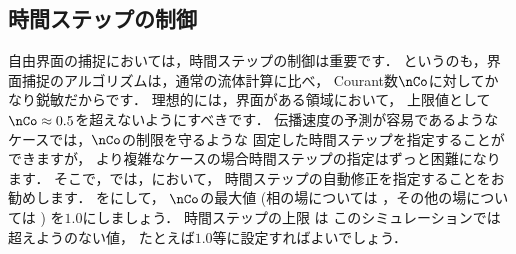 \subsection{時間ステップの制御}
\label{ssec:2.3.5}
自由界面の捕捉においては，時間ステップの制御は重要です．
というのも，界面捕捉のアルゴリズムは，通常の流体計算に比べ，
Courant数$\nCo$に対してかなり鋭敏だからです．
理想的には，界面がある領域において，
上限値として$\nCo \approx 0.5$を超えないようにすべきです．
伝播速度の予測が容易であるようなケースでは，$\nCo$の制限を守るような
固定した時間ステップを指定することができますが，
より複雑なケースの場合時間ステップの指定はずっと困難になります．
そこで，では，において，
時間ステップの自動修正を指定することをお勧めします．
%
%
をにして，
$\nCo$の最大値 (相の場については
%
%
，その他の場については
%
%
) を$1.0$にしましょう．
時間ステップの上限
%
%
は
このシミュレーションでは超えようのない値，
たとえば$1.0$等に設定すればよいでしょう．

